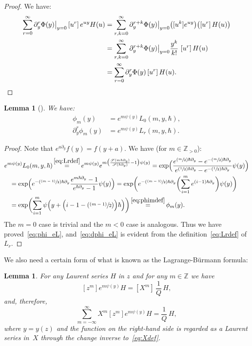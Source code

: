 \documentclass[JEP,XML,SOM,Unicode,NoEqCountersInSection,NoFloatCountersInSection]{cedram}
\let\mathcal\mathscr
\newcommand{\Psfrac}[2]{(\sfrac{#1}{#2})}
\newcommand{\psfrac}[2]{\sfrac{(#1)}{#2}}
\newcommand{\Ppsfrac}[2]{(\psfrac{#1}{#2})}
\theoremstyle{plain}
\newtheorem{lemma}[theorem]{Lemma}
\theoremstyle{definition}
\theoremstyle{remark}
\newcommand{\Z}{\mathbb{Z}}
\newcommand{\cS}{\mathcal{S}}
\begin{document}
\begin{proof} We have:
\begin{align*}
\sum_{r=0}^\infty \partial_y^r\Phi(y)\big|_{y=0} \,[u^r]\,e^{u y}H(u) & =
\sum_{r,k=0}^\infty \partial_y^{r+k}\Phi(y)\big|_{y=0}
\bigl([u^{k}]e^{u y}\bigr)\bigl([u^r]\,H(u)\bigr)\\
& =
\sum_{r,k=0}^\infty \partial_y^{r+k}\Phi(y)\big|_{y=0}\frac{y^k}{k!}\,
\,[u^r]\, H(u) \\
& =
\sum_{r=0}^\infty \partial_y^r\Phi(y)\,[u^r]\,H(u).\qedhere
\end{align*}
\end{proof}

\begin{lemma}[\cite{Kaz2020}]
We have:
\begin{align} \label{eq:phi_eL}
\phi_m(y)&=e^{m\psi(y)}L_0(m,y,\hbar),\\ \label{eq:dphi_eL}
\partial_y^r\phi_m(y)
&=e^{m\psi(y)}L_r(m,y,\hbar).
\end{align}
\end{lemma}
\begin{proof}
Note that $e^{a\partial_y}f(y)=f(y+a)$. We have (for $m\in\mathbb{Z}_{>0}$):
\begin{align*}
&e^{m\psi(y)}L_0(m,y,\hbar) \mathop{=}^{\eqref{eq:Lrdef}}e^{m\psi(y)} e^{m\bigl(\frac{\cS(m\hbar\partial_y)}{\cS(\hbar\partial_y)}-1\bigr)\psi(y)} = \exp\Bigl(\dfrac{e^{\Psfrac{m}{2}\hbar\partial_y}-e^{-\Psfrac{m}{2}\hbar\partial_y}}{e^{\Psfrac{1}{2}\hbar\partial_y}-e^{-\Psfrac{1}{2}\hbar\partial_y}}\psi(y) \Bigr) \\
&\hspace*{3mm}=\exp \Bigl(e^{-\Ppsfrac{m-1}{2}\hbar\partial_y}\dfrac{e^{m\hbar\partial_y}-1}{e^{\hbar\partial_y}-1}\psi(y) \Bigr)=\exp \biggl(e^{-\Ppsfrac{m-1}{2}\hbar\partial_y} \biggl(\sum_{i=1}^me^{(i-1)\hbar\partial_y} \biggr)\psi(y) \biggr) \\
&\hspace*{3mm}=\exp\biggl(\sum_{i=1}^m\psi \Bigl(y+ \Bigl(i-1-\Ppsfrac{m-1}{2} \Bigr)\hbar \Bigr)\biggr) \mathop{=}^{\eqref{eq:phimdef}} \phi_m(y).
\end{align*}
The $m=0$ case is trivial and the $m<0$ case is analogous. Thus we have proved~\eqref{eq:phi_eL}, and~\eqref{eq:dphi_eL} is evident from the definition~\eqref{eq:Lrdef} of $L_r$.
\end{proof}

We also need a certain form of what is known as the Lagrange-Bürmann formula:

\begin{lemma}For any Laurent series $H$ in $z$ and for any $m\in\Z$ we have
\begin{equation*}\label{eq:LagBur}
[z^m] e^{m\psi(y)} H = [X^m] \,\frac{1}{Q}\,H,
\end{equation*}
and, therefore,
\begin{equation}\label{eq:LagBur1}
\sum_{m=-\infty}^\infty X^m [z^m] e^{m\psi(y)} H = \frac{1}{Q}\,H,
\end{equation}
where $y=y(z)$ and the function on the right-hand side is regarded as a Laurent series in~$X$ through the change inverse to~\eqref{eq:Xdef}.
\end{lemma}
\end{document}
